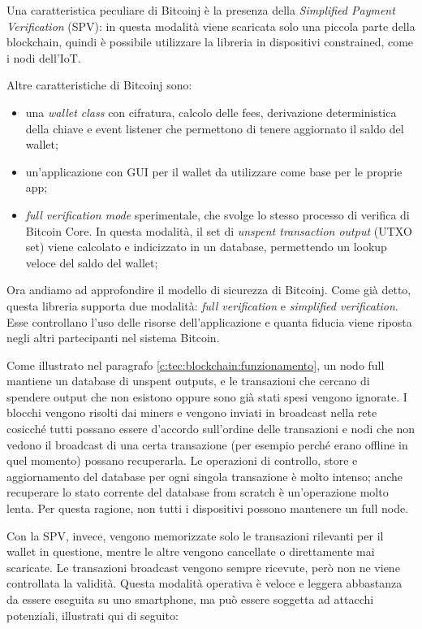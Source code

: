 Una caratteristica peculiare di Bitcoinj è la presenza della \textit{Simplified Payment Verification} (SPV): in questa modalità viene scaricata solo una piccola parte della blockchain, quindi è possibile utilizzare la libreria in dispositivi constrained, come i nodi dell'IoT. 

Altre caratteristiche di Bitcoinj sono: %
\begin{itemize}
    \item una \textit{wallet class} con cifratura, calcolo delle fees, derivazione deterministica della chiave e event listener che permettono di tenere aggiornato il saldo del wallet;
    \item un'applicazione con GUI per il wallet da utilizzare come base per le proprie app;
    \item \textit{full verification mode} sperimentale, che svolge lo stesso processo di verifica di Bitcoin Core. In questa modalità, il set di \textit{unspent transaction output} (UTXO set) viene calcolato e indicizzato in un database, permettendo un lookup veloce del saldo del wallet;
\end{itemize}

Ora andiamo ad approfondire il modello di sicurezza di Bitcoinj. Come gi\`a detto, questa libreria supporta due modalità: \textit{full verification} e \textit{simplified verification}. Esse controllano l'uso delle risorse dell'applicazione e quanta fiducia viene riposta negli altri partecipanti nel sistema Bitcoin. 

Come illustrato nel paragrafo \ref{c:tec:blockchain:funzionamento}, un nodo full mantiene un database di unspent outputs, e le transazioni che cercano di spendere output che non esistono oppure sono già stati spesi vengono ignorate. I blocchi vengono risolti dai miners e vengono inviati in broadcast nella rete cosicché tutti possano essere d'accordo sull'ordine delle transazioni e nodi che non vedono il broadcast di una certa transazione (per esempio perché erano offline in quel momento) possano recuperarla. 
Le operazioni di controllo, store e aggiornamento del database per ogni singola transazione è molto intenso; anche recuperare lo stato corrente del database from scratch è un'operazione molto lenta. Per questa ragione, non tutti i dispositivi possono mantenere un full node.

Con la SPV, invece, vengono memorizzate solo le transazioni rilevanti per il wallet in questione, mentre le altre vengono cancellate o direttamente mai scaricate. Le transazioni broadcast vengono sempre ricevute, però non ne viene controllata la validità. Questa modalità operativa è veloce e leggera abbastanza da essere eseguita su uno smartphone, ma può essere soggetta ad attacchi potenziali, illustrati qui di seguito: 

